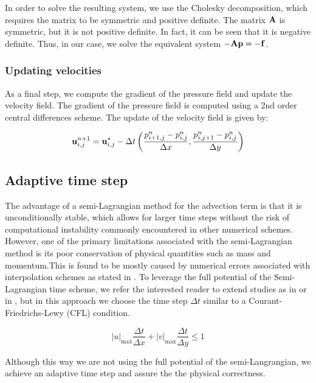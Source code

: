 In order to solve the resulting system, we use the Cholesky decomposition, which requires the matrix to be symmetric and positive definite. The matrix $\boldsymbol{\mathrm{A}}$ is symmetric, but it is not positive definite. In fact, it can be seen that it is negative definite. Thus, in our case, we solve the equivalent system $-\boldsymbol{\mathrm{A}} \boldsymbol{\mathrm{p}} = -\boldsymbol{\mathrm{f}}$.


\subsubsection*{Updating velocities}

As a final step, we compute the gradient of the pressure field and update the velocity field. The gradient of the pressure field is computed using a 2nd order central differences scheme. The update of the velocity field is given by:

\begin{equation*}
  \boldsymbol{\mathrm{u}}_{i,j}^{n+1} = \boldsymbol{\mathrm{u}}_{i,j}^* - \Delta t \left(
  \frac{p_{i+1,j}^{n} - p_{i,j}^{n}}{\Delta x}, \frac{p_{i,j+1}^{n} - p_{i,j}^{n}}{\Delta y}
  \right)
\end{equation*}

\subsection{Adaptive time step}
The advantage of a semi-Lagrangian method for the advection term is that it is unconditionally stable, which allows for larger time steps without the risk of computational instability commonly encountered in other numerical schemes. However, one of the primary limitations associated with the semi-Lagrangian method is its poor conservation of physical quantities such as mass and momentum.This is found to be mostly caused by numerical errors associated with interpolation schemes as stated in \cite{MortezazadehWang2019}. To leverage the full potential of the Semi-Lagrangian time scheme, we refer the interested reader to extend studies as in \cite{Bakhtiari2017} or in \cite{MortezazadehWang2019}, but in this approach we choose the time step $\Delta t$ similar to a Courant-Friedrichs-Lewy (CFL) condition. 

$$|u|_{\text{max}} \frac{\Delta t}{\Delta x} +|v|_{\text{max}} \frac{\Delta t}{\Delta y}\leq 1$$

Although this way we are not using the full potential of the semi-Langrangian, we achieve an adaptive time step and assure the the physical correctness.

